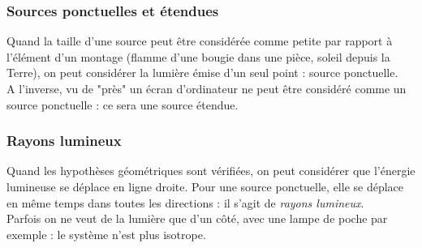 \documentclass	[11pt, a4paper, openany]{book}
\begin{document}
		\subsubsection*{Sources ponctuelles et étendues}
		Quand la taille d'une source peut être considérée comme petite par rapport à l’élément d'un montage (flamme d'une bougie dans une pièce, soleil depuis la Terre), on peut considérer la lumière émise d'un seul point : source ponctuelle.\\
		A l'inverse, vu de "près" un écran d'ordinateur ne peut être considéré comme un source ponctuelle : ce sera une source étendue.
		
		\subsubsection*{Rayons lumineux}
		Quand les  hypothèses géométriques sont vérifiées, on peut considérer que l'énergie lumineuse se déplace en ligne droite. Pour une source ponctuelle, elle se déplace en même temps dans toutes les directions : il s'agit de \textit{rayons lumineux}.\\
		Parfois on ne veut de la lumière que d'un côté, avec une lampe de poche par exemple : le système n'est plus isotrope.
		
\end{document}
